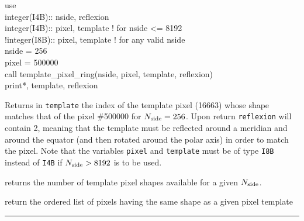 \begin{example}
{
use  \\
integer(I4B):: nside, reflexion\\
integer(I4B):: pixel, template ! for nside <= 8192\\
!integer(I8B):: pixel, template ! for any valid nside\\
nside = 256\\
pixel = 500000\\
call template\_pixel\_ring(nside, pixel, template, reflexion)\\
print*, template, reflexion\\
}
{
Returns in {\tt template} the index of the template pixel (16663) whose shape matches
that of the pixel \#500000 for $N_{\mathrm{side}}=256$. Upon return {\tt reflexion} will
contain 2, meaning that the template must be reflected around a meridian and
around the equator (and then rotated around the polar axis) in order to match
the pixel.
Note that the variables \texttt{pixel} and \texttt{template}
must be of type \texttt{I8B} instead of \texttt{I4B} if $N_{\mathrm{side}}>8192$ is to be used.

}
\end{example}
\begin{related}
  \begin{sulist}{} %
  \item[\htmlref{nside2templates}{sub:nside2ntemplates}] returns the
  number of template pixel shapes available for a given $N_{\mathrm{side}}$.
  \item[\htmlref{same\_shape\_pixels\_ring}{sub:same_shape_pixels_xxx}] 
  \item[\htmlref{same\_shape\_pixels\_nest}{sub:same_shape_pixels_xxx}] 
  return
  the ordered list of pixels having the same shape as a given pixel template
  \end{sulist}
\end{related}

\rule{\hsize}{2mm}

